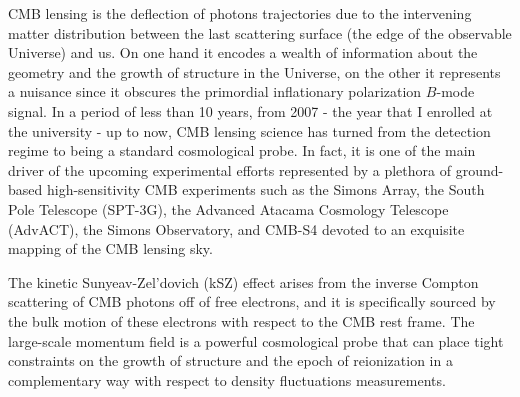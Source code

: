 CMB lensing is the deflection of photons trajectories due to the intervening matter distribution between the last scattering surface (the edge of the observable Universe) and us. On one hand it encodes a wealth of information about the geometry and the growth of structure in the Universe, on the other it represents a nuisance since it obscures the primordial inflationary polarization $B$-mode signal. In a period of less than 10 years, from 2007 - the year that I enrolled at the university - up to now, CMB lensing science has turned from the detection regime to being a standard cosmological probe. In fact, it is one of the main driver of the upcoming experimental efforts represented by a plethora of ground-based high-sensitivity CMB experiments such as the Simons Array, the South Pole Telescope (SPT-3G), the Advanced Atacama Cosmology Telescope (AdvACT), the Simons Observatory, and CMB-S4 devoted to an exquisite mapping of the CMB lensing sky.

The kinetic Sunyeav-Zel'dovich (kSZ) effect arises from the inverse Compton scattering of CMB photons off of free electrons, and it is specifically sourced by the bulk motion of these electrons with respect to the CMB rest frame. The large-scale momentum field is a powerful cosmological probe that can place tight constraints on the growth of structure and the epoch of reionization in a complementary way with respect to density fluctuations measurements. 

